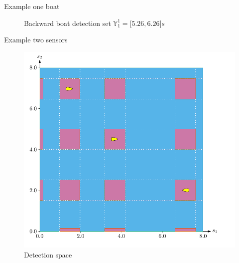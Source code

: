 \documentclass{beamer}
\begin{document}
\begin{frame}{Example one boat}
\begin{minipage}{0.45\textwidth}
\begin{figure}
                        \caption{Backward boat detection set $\mathbb{Y}_1^1 = \lbrack5.26, 6.26\rbrack s$}
                \end{figure}
            \end{minipage}
        \end{frame}

        \begin{frame}{Example two sensors}
            \begin{minipage}{0.45\textwidth}
                \begin{figure}
                        \includegraphics[width=\textwidth]{imgs/ex_detection_space}
                        \caption{Detection space}
                \end{figure}
            \end{minipage}
            \hfill
            \begin{minipage}{0.45\textwidth}
                \begin{figure}

\end{figure}
\end{minipage}
\end{frame}
\end{document}
